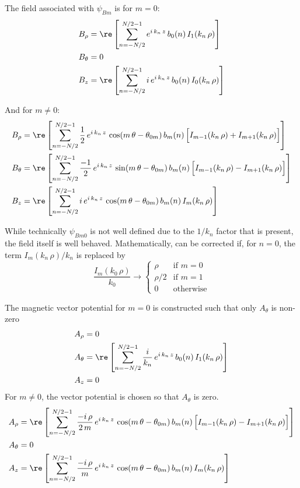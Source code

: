 The field associated with $\psi_{Bm}$ is for $m = 0$:
\begin{align}
  B_\rho &= \re \left[ 
    \sum_{n=-N/2}^{N/2-1} e^{i \, k_n \, z} \, b_0(n) \,
    I_1(k_n \, \rho) \right] \CRNO
  B_\theta &= 0 \\
  B_z &= \re \left[ 
    \sum_{n=-N/2}^{N/2-1} i \, e^{i \, k_n \, z} \, b_0(n) \,
    I_0(k_n \, \rho) \right]
    \nonumber
\end{align}

And for $m \neq 0$:
\begin{align}
  B_\rho &= \re \left[ 
    \sum_{n=-N/2}^{N/2-1} \frac{1}{2} \, e^{i \, k_n \, z} \, 
    \cos (m \, \theta - \theta_{0m}) \, b_m(n) \,
    \Big[ I_{m-1}(k_n \, \rho) + I_{m+1}(k_n \, \rho) \Big] \right] \CRNO
  B_\theta &= \re \left[ 
    \sum_{n=-N/2}^{N/2-1} \frac{-1}{2} \, e^{i \, k_n \, z} \, 
    \sin (m \, \theta - \theta_{0m}) \, b_m(n) \,
    \Big[ I_{m-1}(k_n \, \rho) - I_{m+1}(k_n \, \rho) \Big] \right] \\
  B_z &= \re \left[ 
    \sum_{n=-N/2}^{N/2-1} i \, e^{i \, k_n \, z} \, 
    \cos (m \, \theta - \theta_{0m}) \, b_m(n) \,
    I_m(k_n \, \rho) \right]
    \nonumber
\end{align}

While technically $\psi_{Bm0}$ is not well defined due to the $1/k_n$ factor that is present, the
field itself is well behaved. Mathematically,  can be corrected if, for $n = 0$, the term
$I_m(k_n \, \rho) / k_n$ is replaced by
\begin{equation}
  \frac{I_m(k_0 \, \rho)}{k_0} \rightarrow 
  \begin{cases}
    \rho   &\text{if } m = 0 \\
    \rho/2 &\text{if } m = 1 \\
    0      &\text{otherwise}
  \end{cases}
\end{equation}

The magnetic vector potential for $m = 0$ is constructed such that only $A_\theta$ is non-zero
\begin{align}
  A_\rho &= 0 \CRNO
  A_\theta &= \re \left[ 
    \sum_{n=-N/2}^{N/2-1} \frac{i}{k_n} \, e^{i \, k_n \, z} \, b_0(n) \, I_1(k_n \, \rho) \right] \\
  A_z    &= 0 \nonumber
\end{align}
For $m \ne 0$, the vector potential is chosen so that $A_\theta$ is zero.
\begin{align}
  A_\rho &= \re \left[ 
    \sum_{n=-N/2}^{N/2-1} \frac{-i \, \rho}{2 \, m} \, e^{i \, k_n \, z} \, 
    \cos (m \, \theta - \theta_{0m}) \, b_m(n) \,
    \Big[ I_{m-1}(k_n \, \rho) - I_{m+1}(k_n \, \rho) \Big] \right] \CRNO
  A_\theta &= 0 \\
  A_z    &= \re \left[ 
    \sum_{n=-N/2}^{N/2-1} \frac{-i \, \rho}{m} \, e^{i \, k_n \, z} \, 
    \cos (m \, \theta - \theta_{0m}) \, b_m(n) \,
    I_m(k_n \, \rho) \right] \nonumber
\end{align}

